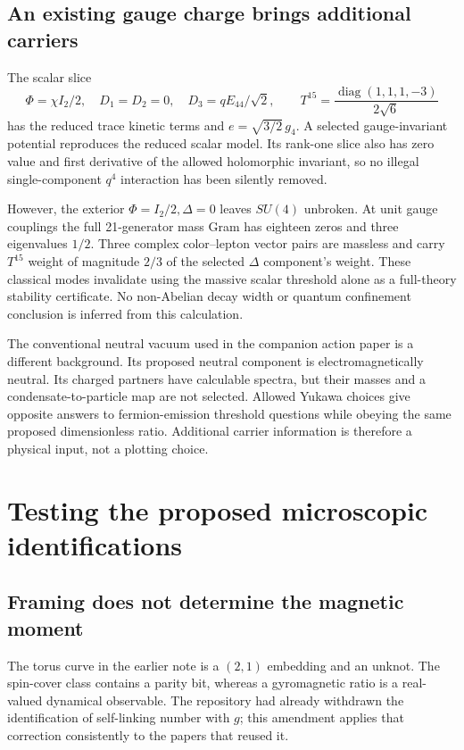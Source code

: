 \documentclass[11pt]{article}
\begin{document}
\subsection{An existing gauge charge brings additional carriers}
The scalar slice
\begin{equation}
 \Phi=\chi I_2/2,\quad D_1=D_2=0,\quad D_3=qE_{44}/\sqrt2,
 \qquad T^{15}=\frac{\operatorname{diag}(1,1,1,-3)}{2\sqrt6}
\end{equation}
has the reduced trace kinetic terms and
$e=\sqrt{3/2}\,g_4$. A selected gauge-invariant potential reproduces
the reduced scalar model. Its rank-one slice also has zero value and
first derivative of the allowed holomorphic invariant, so no illegal
single-component $q^4$ interaction has been silently removed.

However, the exterior $\Phi=I_2/2,\Delta=0$ leaves $SU(4)$ unbroken.
At unit gauge couplings the full 21-generator mass Gram has eighteen
zeros and three eigenvalues $1/2$. Three complex color--lepton vector
pairs are massless and carry $T^{15}$ weight of magnitude $2/3$ of
the selected $\Delta$ component's weight. These classical modes invalidate
using the massive scalar threshold alone as a full-theory stability
certificate. No non-Abelian decay width or quantum confinement conclusion
is inferred from this calculation.

The conventional neutral vacuum used in the companion action paper is a
different background. Its proposed neutral component is electromagnetically
neutral. Its charged partners have calculable spectra, but their masses
and a condensate-to-particle map are not selected. Allowed Yukawa choices
give opposite answers to fermion-emission threshold questions while obeying
the same proposed dimensionless ratio. Additional carrier information is
therefore a physical input, not a plotting choice.

\section{Testing the proposed microscopic identifications}
\subsection{Framing does not determine the magnetic moment}
The torus curve in the earlier note is a $(2,1)$ embedding and an unknot.
The spin-cover class contains a parity bit, whereas a gyromagnetic ratio is
a real-valued dynamical observable. The repository had already withdrawn
the identification of self-linking number with $g$; this amendment applies
that correction consistently to the papers that reused it.
\end{document}
